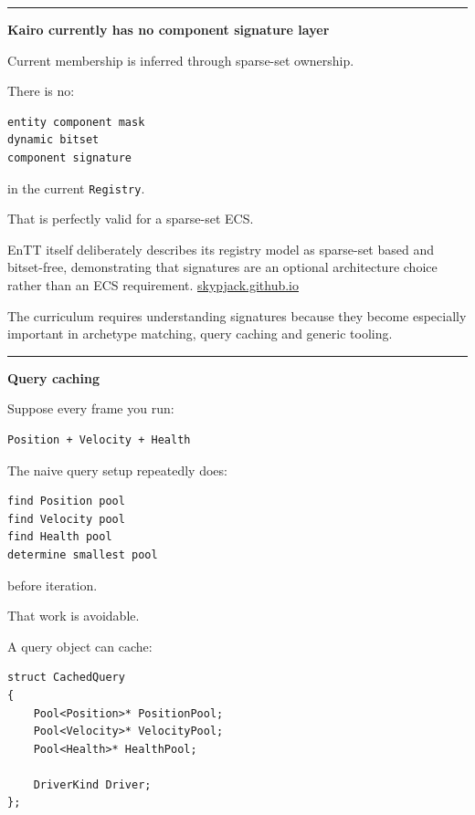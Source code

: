 \begin{center}\rule{0.5\linewidth}{0.5pt}\end{center}

\textbf{Kairo currently has no component signature layer}

Current membership is inferred through sparse-set ownership.

There is no:

\begin{verbatim}
entity component mask
dynamic bitset
component signature
\end{verbatim}

in the current \texttt{Registry}.

That is perfectly valid for a sparse-set ECS.

EnTT itself deliberately describes its registry model as sparse-set based and bitset-free, demonstrating that signatures are an optional architecture choice rather than an ECS requirement. \href{https://skypjack.github.io/entt/md_docs_2md_2entity.html?utm_source=chatgpt.com}{skypjack.github.io}

The curriculum requires understanding signatures because they become especially important in archetype matching, query caching and generic tooling.

\begin{center}\rule{0.5\linewidth}{0.5pt}\end{center}

\textbf{Query caching}

Suppose every frame you run:

\begin{verbatim}
Position + Velocity + Health
\end{verbatim}

The naive query setup repeatedly does:

\begin{verbatim}
find Position pool
find Velocity pool
find Health pool
determine smallest pool
\end{verbatim}

before iteration.

That work is avoidable.

A query object can cache:

\begin{verbatim}
struct CachedQuery
{
    Pool<Position>* PositionPool;
    Pool<Velocity>* VelocityPool;
    Pool<Health>* HealthPool;

    DriverKind Driver;
};
\end{verbatim}

